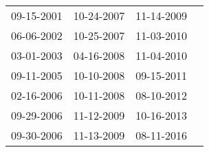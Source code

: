 \begin{supertabular}{llll}
 09-15-2001 &  10-24-2007 &  11-14-2009 \\
 06-06-2002 &  10-25-2007 &  11-03-2010 \\
 03-01-2003 &  04-16-2008 &  11-04-2010 \\
 09-11-2005 &  10-10-2008 &  09-15-2011 \\
 02-16-2006 &  10-11-2008 &  08-10-2012 \\
 09-29-2006 &  11-12-2009 &  10-16-2013 \\
 09-30-2006 &  11-13-2009 &  08-11-2016 \\
\end{supertabular}
